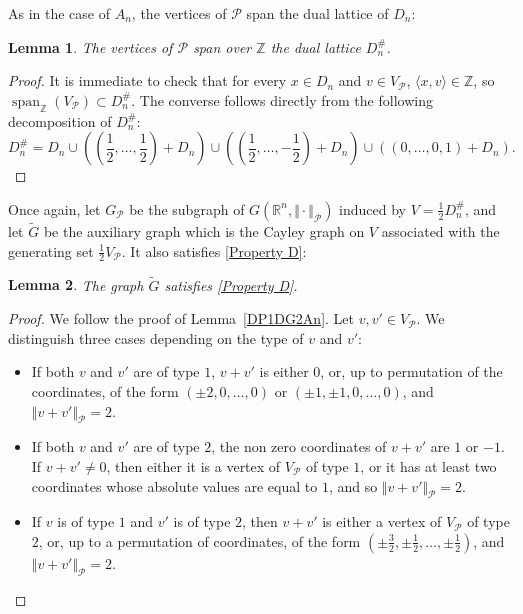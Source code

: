 \documentclass{amsart}                     %
\newtheorem{lemm}{Lemma}
\newcommand{\Z}{{\mathbb Z}}
\newcommand{\R}{{\mathbb R}}
\newcommand{\Span}{\operatorname{span}}
\newcommand{\lref}[1]{Lemma~\textup{\ref{#1}}}
\begin{document}
As in the case of $A_n$, the vertices of $\mathcal{P}$ span the dual lattice of $D_n$:

\begin{lemm}
The vertices of $\mathcal{P}$ span over $\Z$ the dual lattice  $ D_n^\# $.
\end{lemm}

\begin{proof}
It is immediate to check that for every $x\in D_n$ and $v\in V_\mathcal{P}$, $\langle x,v \rangle \in \Z$, so $\Span_\Z(V_\mathcal{P})\subset D_n^\#$. The converse follows directly from the following decomposition of $D_n^\#$:
$$ D_n^\# = D_n \cup \left(\left(\frac{1}{2},\ldots,\frac{1}{2}\right)+D_n\right) \cup \left(\left(\frac{1}{2},\ldots,-\frac{1}{2}\right)+D_n\right) \cup ((0,\ldots,0,1)+D_n).$$
\end{proof}

Once again, let $G_\mathcal{P}$ be the subgraph of $ G(\R^n,\Vert \cdot \Vert_\mathcal{P})$ induced by $V=\frac{1}{2} D_n^\#$, and let $\tilde{G}$ be the  auxiliary graph which is the  Cayley graph on $V$
associated with the generating set $\frac{1}{2}V_\mathcal{P}$. It also satisfies \eqref{Property D}:

\begin{lemm}\label{DP1DG2Dn}
The graph $\tilde{G}$ satisfies \eqref{Property D}.
\end{lemm} 

\begin{proof}
We follow the proof of \lref{DP1DG2An}. Let $v,v'\in V_\mathcal{P}$. We distinguish three cases depending on the type of $v$ and $v'$:
\begin{itemize}
\item If both $v$ and $v'$ are of type $1$, $v+v'$ is either $0$, or, up to permutation of the coordinates, of the form $(\pm 2,0,\ldots,0)$ or $(\pm 1, \pm 1, 0,\ldots,0)$, and ${\Vert  v+v'\Vert_\mathcal{P}  =2}$.
\item If both $v$ and $v'$ are of type $2$, the non zero coordinates of $v+v'$ are $1$ or $-1$. If $v+v'\neq 0$, then either it is a vertex of $V_\mathcal{P}$ of type $1$, or it has at least two coordinates whose absolute values are equal to $1$, and so $\Vert  v+v'\Vert_\mathcal{P}  =2$.
\item If $v$ is of type $1$ and $v'$ is of type $2$, then $v+v'$ is either a vertex of $V_\mathcal{P}$ of type $2$, or, up to a permutation of coordinates, of the form $\left(\pm \frac{3}{2},\pm \frac{1}{2},\ldots,\pm \frac{1}{2}\right)$, and $\Vert  v+v'\Vert_\mathcal{P}  =2$.
\end{itemize} 
\end{proof}
\end{document}
